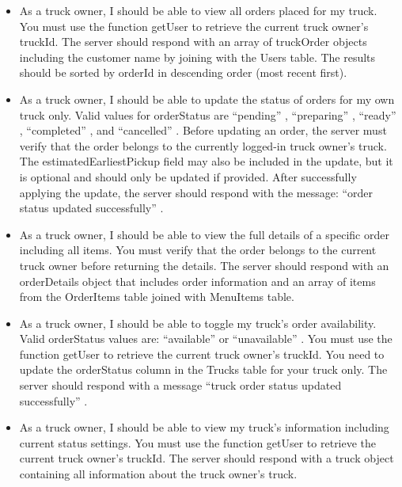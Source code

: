 \documentclass[12pt,a4paper]{article}
\begin{document}
\begin{storybox}
\begin{itemize}[leftmargin=1em, itemsep=6pt]
    \item As a truck owner, I should be able to view all orders placed for my truck. You must use the function getUser to retrieve the current truck owner's truckId. The server should respond with an array of truckOrder objects including the customer name by joining with the Users table. The results should be sorted by orderId in descending order (most recent first).
    \item As a truck owner, I should be able to update the status of orders for my own truck only. Valid values for orderStatus are “pending” , “preparing” , “ready” , “completed” , and “cancelled” . Before updating an order, the server must verify that the order belongs to the currently logged-in truck owner’s truck. The estimatedEarliestPickup field may also be included in the update, but it is optional and should only be updated if provided. After successfully applying the update, the server should respond with the message: “order status updated successfully” .
    \item As a truck owner, I should be able to view the full details of a specific order including all items. You must verify that the order belongs to the current truck owner before returning the details. The server should respond with an orderDetails object that includes order information and an array of items from the OrderItems table joined with MenuItems table.
    \item As a truck owner, I should be able to toggle my truck’s order availability. Valid orderStatus values are: “available” or “unavailable” . You must use the function getUser to retrieve the current truck owner’s truckId. You need to update the orderStatus column in the Trucks table for your truck only. The server should respond with a message “truck order status updated successfully” .
    \item As a truck owner, I should be able to view my truck’s information including current status settings. You must use the function getUser to retrieve the current truck owner’s truckId. The server should respond with a truck object containing all information about the truck owner’s truck.

\end{itemize}
\end{storybox}

\vspace{1em}
\end{document}

